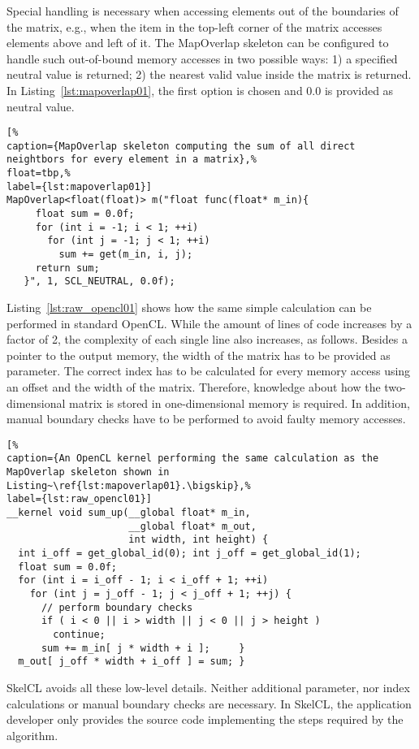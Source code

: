 Special handling is necessary when accessing elements out of the boundaries of the matrix, e.g., when the item in the top-left corner of the matrix accesses elements above and left of it.
The MapOverlap skeleton can be configured to handle such out-of-bound memory accesses in two possible ways:
1) a specified neutral value is returned;
2) the nearest valid value inside the matrix is returned.
In Listing~\ref{lst:mapoverlap01}, the first option is chosen and $0.0$ is provided as neutral value.

\begin{lstlisting}[%
caption={MapOverlap skeleton computing the sum of all direct neightbors for every element in a matrix},%
float=tbp,%
label={lst:mapoverlap01}]
MapOverlap<float(float)> m("float func(float* m_in){
     float sum = 0.0f;
     for (int i = -1; i < 1; ++i)
       for (int j = -1; j < 1; ++i)
         sum += get(m_in, i, j);
     return sum;
   }", 1, SCL_NEUTRAL, 0.0f);
\end{lstlisting}

Listing~\ref{lst:raw_opencl01} shows how the same simple calculation can be performed in standard OpenCL.
While the amount of lines of code increases by a factor of 2, the complexity of each single line also increases, as follows.
Besides a pointer to the output memory, the width of the matrix has to be provided as parameter.
The correct index has to be calculated for every memory access using an offset and the width of the matrix.
Therefore, knowledge about how the two-dimensional matrix is stored in one-dimensional memory is required.
In addition, manual boundary checks have to be performed to avoid faulty memory accesses.\bigskip

\begin{lstlisting}[%
caption={An OpenCL kernel performing the same calculation as the MapOverlap skeleton shown in Listing~\ref{lst:mapoverlap01}.\bigskip},%
label={lst:raw_opencl01}]
__kernel void sum_up(__global float* m_in,
                     __global float* m_out,
                     int width, int height) {
  int i_off = get_global_id(0); int j_off = get_global_id(1);
  float sum = 0.0f;
  for (int i = i_off - 1; i < i_off + 1; ++i)
    for (int j = j_off - 1; j < j_off + 1; ++j) {
      // perform boundary checks
      if ( i < 0 || i > width || j < 0 || j > height )
        continue;
      sum += m_in[ j * width + i ];     }
  m_out[ j_off * width + i_off ] = sum; }
\end{lstlisting}

SkelCL avoids all these low-level details.
Neither additional parameter, nor index calculations or manual boundary checks are necessary.
In SkelCL, the application developer only provides the source code implementing the steps required by the algorithm.

